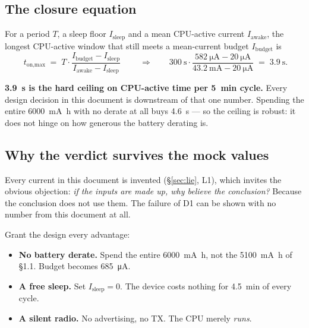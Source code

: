 \documentclass[11pt,a4paper]{article}
\begin{document}
\subsection{The closure equation}

For a period $T$, a sleep floor $I_\text{sleep}$ and a mean CPU-active current $I_\text{awake}$,
the longest CPU-active window that still meets a mean-current budget $I_\text{budget}$ is
\[
\boxed{\;
t_\text{on,max} \;=\; T \cdot \frac{I_\text{budget} - I_\text{sleep}}{I_\text{awake} - I_\text{sleep}}
\;}
\qquad\Longrightarrow\qquad
\SI{300}{\second}\cdot\frac{\SI{582}{\micro\ampere} - \SI{20}{\micro\ampere}}
                           {\SI{43.2}{\milli\ampere} - \SI{20}{\micro\ampere}}
\;=\; \SI{3.9}{\second}.
\]

\noindent
\textbf{\SI{3.9}{\second} is the hard ceiling on CPU-active time per \SI{5}{\minute} cycle.} Every
design decision in this document is downstream of that one number. Spending the entire
\SI{6000}{\milli\ampere\hour} with no derate at all buys \SI{4.6}{\second} --- so the ceiling is
robust: it does not hinge on how generous the battery derating is.

\medskip
\noindent
{}

\subsection{Why the verdict survives the mock values}
\label{sec:robust}

\noindent
Every current in this document is invented (\S\ref{sec:lie}, L1), which invites the obvious
objection: \emph{if the inputs are made up, why believe the conclusion?} Because the conclusion
does not use them. The failure of D1 can be shown with no number from this document at all.

\medskip
\noindent
Grant the design every advantage:

\begin{itemize}[leftmargin=*,nosep]
  \item \textbf{No battery derate.} Spend the entire \SI{6000}{\milli\ampere\hour}, not the
        \SI{5100}{\milli\ampere\hour} of \S1.1. Budget becomes \SI{685}{\micro\ampere}.
  \item \textbf{A free sleep.} Set $I_\text{sleep} = 0$. The device costs nothing for
        \SI{4.5}{\minute} of every cycle.
  \item \textbf{A silent radio.} No advertising, no TX. The CPU merely \emph{runs}.
\end{itemize}
\end{document}

